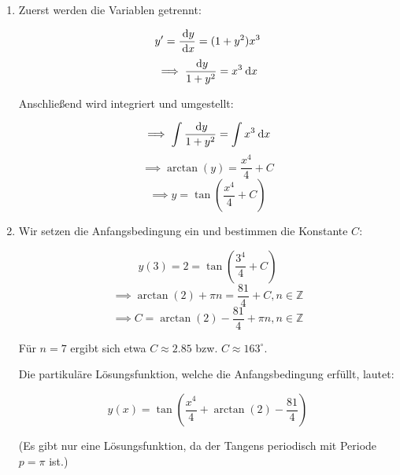 \item 

\begin{enumerate}

\item Zuerst werden die Variablen getrennt:

$$y' = \frac{\:\mathrm{d}{y}}{\:\mathrm{d}{x}} = (1+y^2)x^3$$
$$\implies \frac{\:\mathrm{d}{y}}{1+y^2} = x^3 \:\mathrm{d}{x}$$

Anschließend wird integriert und umgestellt:

$$\implies \int \frac{\:\mathrm{d}{y}}{1+y^2} = \int x^3 \:\mathrm{d}{x}$$
$$\implies \arctan(y) = \frac{x^4}{4} + C$$
$$\implies y = \tan(\frac{x^4}{4} + C)$$

\item Wir setzen die Anfangsbedingung ein und bestimmen die Konstante $C$:

$$y(3) = 2 = \tan(\frac{3^4}{4} + C)$$
$$\implies \arctan(2) + \pi n= \frac{81}{4} + C, n \in \mathbb{Z}$$
$$\implies C = \arctan(2) - \frac{81}{4} + \pi n, n \in \mathbb{Z}$$

Für $n=7$ ergibt sich etwa $C \approx 2.85$ bzw. $C \approx 163^\circ$.

Die partikuläre Lösungsfunktion, welche die Anfangsbedingung erfüllt, lautet:

$$y(x) = \tan(\frac{x^4}{4} + \arctan(2) - \frac{81}{4})$$

(Es gibt nur eine Lösungsfunktion, da der Tangens periodisch mit Periode $p=\pi$ ist.)

\end{enumerate}

